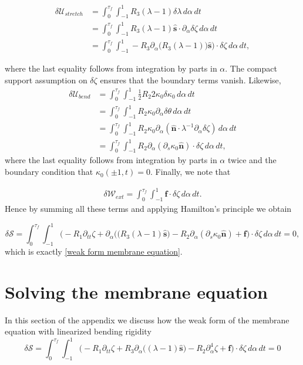 \documentclass{article}[12pt]
\theoremstyle{Theorem}
\begin{document}
\begin{align}
    \delta\mathcal{U}_{stretch} &= \int_0^{\tau_f}\int_{-1}^1R_3 (\lambda-1)\delta\lambda \,d\alpha\, dt \\
    &= \int_0^{\tau_f}\int_{-1}^1 R_3 (\lambda-1)\hat{\boldsymbol{s}}\cdot\partial_\alpha\delta\zeta \,d\alpha\, dt \\ 
    &=\int_0^{\tau_f}\int_{-1}^1-R_3 \partial_\alpha\big(R_3 (\lambda-1)\big)\hat{\boldsymbol{s}}\big)\cdot\delta\zeta \,d\alpha\, dt,
\end{align}

where the last equality follows from integration by parts in $\alpha$. The compact support assumption on $\delta \zeta$ ensures that the boundary terms vanish. 
Likewise,
\begin{align}
    \delta\mathcal{U}_{bend} &= \int_0^{\tau_f}\int_{-1}^1\frac{1}{2}R_2 2\kappa_0\delta\kappa_0 \,d\alpha\, dt \\
    &= \int_0^{\tau_f}\int_{-1}^1R_2 \kappa_0\partial_\alpha\delta\theta \,d\alpha\, dt \\
    &= \int_0^{\tau_f}\int_{-1}^1R_2 \kappa_0\partial_\alpha(\hat{\boldsymbol{n}} \cdot\lambda^{-1}\partial_\alpha\delta\zeta) \,d\alpha\, dt \\
    &=\int_0^{\tau_f}\int_{-1}^1R_2\partial_\alpha( \partial_s\kappa_0\hat{\boldsymbol{n}}) \cdot\delta\zeta \,d\alpha\, dt,
\end{align}
where the last equality follows from integration by parts in $\alpha$ twice and the  boundary condition that $\kappa_0(\pm1,t) = 0$. Finally, we note that 

\begin{align}
    \delta\mathcal{W}_{ext} = \int_0^{\tau_f}\int_{-1}^{1}\boldsymbol{f}\cdot\delta\zeta\,d\alpha\,dt.
\end{align}
Hence by summing all these terms and applying Hamilton's principle we obtain

\begin{equation}
    \delta\mathcal{S} =\int_0^{\tau_f}\int_{-1}^1\bigg(-R_1\partial_{tt}\zeta +\partial_\alpha\big(\big(R_3 (\lambda-1)\hat{\boldsymbol{s}}\big) - R_2\partial_\alpha( \partial_s\kappa_0\hat{\boldsymbol{n}}) +\boldsymbol{f} \bigg)\cdot\delta\zeta\,d\alpha\, dt = 0,
    \label{weak form of the membrane equation appendix}
\end{equation}
 which is exactly \eqref{weak form membrane equation}.

\section{Solving the membrane equation}
\label{solving the membrane equation appendix}
In this section of the appendix we discuss how the weak form of the membrane equation with linearized bending rigidity \begin{equation}
    \delta\mathcal{S} =\int_0^{\tau_f}\int_{-1}^1\bigg(-R_1\partial_{tt}\zeta +R_3\partial_\alpha\big( (\lambda-1)\hat{\boldsymbol{s}}\big) - R_2\partial_\alpha^4\zeta +\boldsymbol{f} \bigg)\cdot\delta\zeta\,d\alpha\, dt = 0
    \label{linearized weak form membrane equation appendix}
\end{equation}
\end{document}
